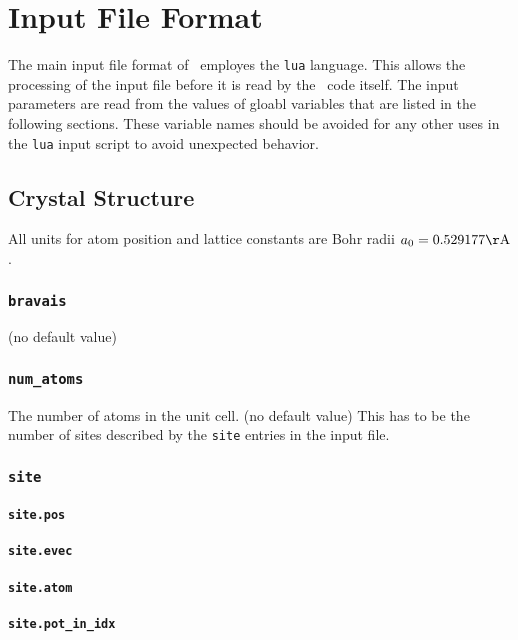 \chapter{Input File Format}
The main input file format of \LSMS\ employes the \texttt{lua} language.
This allows the processing of the input file before it is read by the
\LSMS\ code itself. The input parameters are read from the values of
gloabl variables that are listed in the following sections.
These variable names should be avoided for any other uses in the \texttt{lua}
input script to avoid unexpected behavior.


\section{Crystal Structure}

All units for atom position and lattice constants are Bohr radii $a_0=0.529177\mathrm{\AA}$.
\subsection{\texttt{bravais}}
(no default value)

\subsection{\texttt{num\_atoms}}
The number of atoms in the unit cell. (no default value) This has to
be the number of sites described by the \texttt{site} entries in the
input file.

\subsection{\texttt{site}}

\subsubsection{\texttt{site.pos}}

\subsubsection{\texttt{site.evec}}

\subsubsection{\texttt{site.atom}}

\subsubsection{\texttt{site.pot\_in\_idx}}

